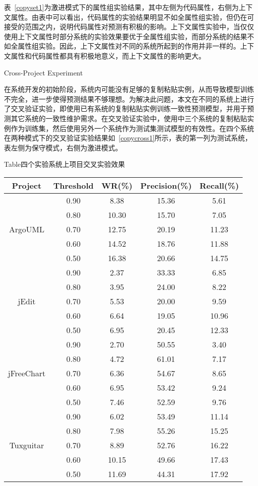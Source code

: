 表~\ref{copyset1}为激进模式下的属性组实验结果，其中左侧为代码属性，右侧为上下文属性。由表中可以看出，代码属性的实验结果明显不如全属性组实验，但仍在可接受的范围之内，说明代码属性对预测有积极的影响。上下文属性实验中，当仅仅使用上下文属性时部分系统的实验效果要优于全属性组实验，而部分系统的结果不如全属性组实验。因此，上下文属性对不同的系统所起到的作用并非一样的。上下文属性和代码属性都具有积极地意义，而上下文属性的影响更大。

{Cross-Project Experiment}

在系统开发的初始阶段，系统内可能没有足够的复制粘贴实例，从而导致模型训练不完全，进一步使得预测结果不够理想。为解决此问题，本文在不同的系统上进行了交叉验证实验，即使用已有系统的复制粘贴实例训练一致性预测模型，并用于预测其它系统的一致性维护需求。在交叉验证实验中，使用中三个系统的复制粘贴实例作为训练集，然后使用另外一个系统作为测试集测试模型的有效性。在四个系统在两种模式下的交叉验证实验结果如~\ref{copycross1}所示，表的第一列为测试系统，表左侧为保守模式，右侧为激进模式。


\begin{table}[htbp]
{Table$\!$}{四个实验系统上项目交叉实验效果}
\vspace{0.5em}
\centering
\wuhao
\begin{tabular}{ccccc}
\toprule[1.5pt]
\textbf{Project}&\textbf{Threshold}&\textbf{WR(\%)}&\textbf{Precision(\%)}&\textbf{Recall(\%)}\\
\midrule[1pt]
\multirow{5}{*}{ArgoUML}
&0.90&	8.38&	15.36&	5.61\\
&0.80&	10.30&	15.70&	7.05\\
&0.70&	12.75&	20.19&	11.23\\
&0.60&	14.52&	18.76&	11.88\\
&0.50&	16.38&	20.66&	14.75\\

\multirow{5}{*}{jEdit}
&0.90&	2.37&	33.33&	6.85\\
&0.80&	3.95&	24.00&	8.22\\
&0.70&	5.53&	20.00&	9.59\\
&0.60&	6.64&	19.05&	10.96\\
&0.50&	6.95&	20.45&	12.33\\

\multirow{5}{*}{jFreeChart}
&0.90&	2.70&	50.55&	3.40\\
&0.80&	4.72&	61.01&	7.17\\
&0.70&	6.36&	54.67&	8.65\\
&0.60&	6.95&	53.42&	9.24\\
&0.50&	7.46&	52.59&	9.76\\

\multirow{5}{*}{Tuxguitar}
&0.90&	6.02&	53.49&	11.14\\
&0.80&	7.98&	55.26&	15.25\\
&0.70&	8.89&	52.76&	16.22\\
&0.60&	10.15&	49.66&	17.43\\
&0.50&	11.69&	44.31&	17.92\\
\bottomrule[1.5pt]
\end{tabular}
\end{table}

